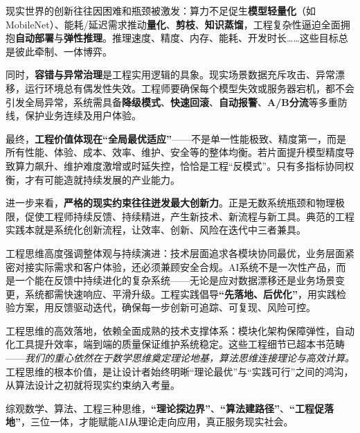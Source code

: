 现实世界的创新往往因困难和瓶颈被激发：算力不足促生\textbf{模型轻量化}（如MobileNet）、能耗\slash 延迟需求推动\textbf{量化}、\textbf{剪枝}、\textbf{知识蒸馏}，工程复杂性逼迫全面拥抱\textbf{自动部署}与\textbf{弹性推理}。推理速度、精度、内存、能耗、开发时长……这些目标总是彼此牵制、一体博弈。

同时，\textbf{容错与异常治理}是工程实用逻辑的具象。现实场景数据充斥攻击、异常漂移，运行环境总有偶发性失效。工程师要确保每个模型失效或服务器宕机，都不会引发全局异常，系统需具备\textbf{降级模式}、\textbf{快速回滚}、\textbf{自动报警}、\textbf{A/B分流}等多重防线，保护业务连续及用户体验。

最终，\textbf{工程价值体现在“全局最优适应”}——不是单一性能极致、精度第一，而是所有性能、体验、成本、效率、维护、安全等的整体均衡。若片面提升模型精度导致算力飙升、维护难度激增或时延失控，恰恰是工程“反模式”。只有多指标协同权衡，才有可能造就持续发展的产业能力。

进一步来看，\textbf{严格的现实约束往往迸发最大创新力}。正是无数系统瓶颈和物理极限，促使工程师持续反馈、持续精进，产生新技术、新流程与新工具。典范的工程实践本就是系统化创新流程，让效率、创新、风险在迭代中三者兼具。


工程思维高度强调整体观与持续演进：技术层面追求各模块协同最优，业务层面紧密对接实际需求和客户体验，还必须兼顾安全合规。AI系统不是一次性产品，而是一个能在反馈中持续进化的复杂系统——无论是应对数据漂移还是业务场景变更，系统都需快速响应、平滑升级。工程实践倡导\textbf{“先落地、后优化”}，用实践检验方案，用反馈驱动迭代，确保每一步创新可追踪、可复现、风险可控。


工程思维的高效落地，依赖全面成熟的技术支撑体系：模块化架构保障弹性，自动化工具提升效率，端到端的质量保证维护系统稳定。这些工程细节已超本书范畴——\textit{我们的重心依然在于数学思维奠定理论地基，算法思维连接理论与高效计算。}工程思维的根本价值，是让设计者始终明晰“理论最优”与“实践可行”之间的鸿沟，从算法设计之初就将现实约束纳入考量。

\vspace{0.5em}
综观数学、算法、工程三种思维，\textbf{“理论探边界”}、\textbf{“算法建路径”}、\textbf{“工程促落地”}，三位一体，才能赋能AI从理论走向应用，真正服务现实社会。


